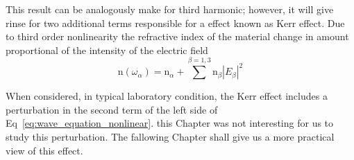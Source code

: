 This result can be analogously make for third harmonic; however, it will give rinse for two additional terms responsible for a effect known as Kerr effect\needcit. Due to third order nonlinearity the refractive index of the material change in amount proportional of the intensity of the electric field
\begin{equation}
    \text{n}(\omega_\alpha) = \text{n}_\alpha + \sum^{\beta=1,3} \text{n}_\beta |E_\beta|^2
    \label{eq:kerr_effect_free_wave}
\end{equation}

When considered, in typical laboratory condition, the Kerr effect includes a perturbation in the second term of the left side of Eq~\ref{eq:wave_equation_nonlinear}. this Chapter was not interesting for us to study this perturbation. The fallowing Chapter shall give us a more practical view of this effect.